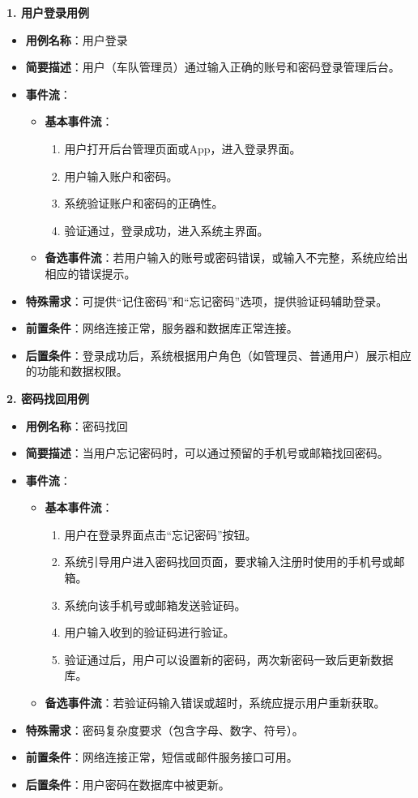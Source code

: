 \documentclass[a4paper,12pt]{article}
\begin{document}
\textbf{1. 用户登录用例}
\begin{itemize}
    \item \textbf{用例名称}：用户登录
    \item \textbf{简要描述}：用户（车队管理员）通过输入正确的账号和密码登录管理后台。
    \item \textbf{事件流}：
    \begin{itemize}
        \item \textbf{基本事件流}：
        \begin{enumerate}
            \item 用户打开后台管理页面或App，进入登录界面。
            \item 用户输入账户和密码。
            \item 系统验证账户和密码的正确性。
            \item 验证通过，登录成功，进入系统主界面。
        \end{enumerate}
        \item \textbf{备选事件流}：若用户输入的账号或密码错误，或输入不完整，系统应给出相应的错误提示。
    \end{itemize}
    \item \textbf{特殊需求}：可提供“记住密码”和“忘记密码”选项，提供验证码辅助登录。
    \item \textbf{前置条件}：网络连接正常，服务器和数据库正常连接。
    \item \textbf{后置条件}：登录成功后，系统根据用户角色（如管理员、普通用户）展示相应的功能和数据权限。
\end{itemize}

\textbf{2. 密码找回用例}
\begin{itemize}
    \item \textbf{用例名称}：密码找回
    \item \textbf{简要描述}：当用户忘记密码时，可以通过预留的手机号或邮箱找回密码。
    \item \textbf{事件流}：
    \begin{itemize}
        \item \textbf{基本事件流}：
        \begin{enumerate}
            \item 用户在登录界面点击“忘记密码”按钮。
            \item 系统引导用户进入密码找回页面，要求输入注册时使用的手机号或邮箱。
            \item 系统向该手机号或邮箱发送验证码。
            \item 用户输入收到的验证码进行验证。
            \item 验证通过后，用户可以设置新的密码，两次新密码一致后更新数据库。
        \end{enumerate}
        \item \textbf{备选事件流}：若验证码输入错误或超时，系统应提示用户重新获取。
    \end{itemize}
    \item \textbf{特殊需求}：密码复杂度要求（包含字母、数字、符号）。
    \item \textbf{前置条件}：网络连接正常，短信或邮件服务接口可用。
    \item \textbf{后置条件}：用户密码在数据库中被更新。
\end{itemize}
\end{document}
